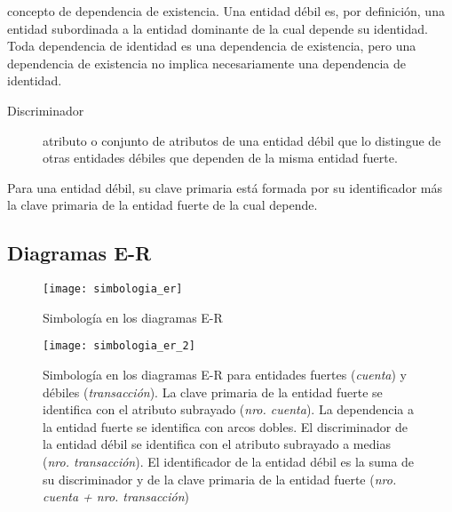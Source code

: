 \documentclass[a4paper, twoside]{article}
\begin{document}
concepto de dependencia de existencia. Una entidad débil es, por definición,
una entidad subordinada a la entidad dominante de la cual depende
su identidad. Toda dependencia de identidad es una dependencia de
existencia, pero una dependencia de existencia no implica necesariamente
una dependencia de identidad.
\begin{description}
\item [{Discriminador}] atributo o conjunto de atributos de una entidad
débil que lo distingue de otras entidades débiles que dependen de
la misma entidad fuerte.
\end{description}
Para una entidad débil, su clave primaria está formada por su identificador
más la clave primaria de la entidad fuerte de la cual depende.


\subsection{Diagramas E-R}

\begin{figure}[H]
\noindent \begin{centering}
\texttt{[image: simbologia\_er]}
\par\end{centering}

\protect\caption{Simbología en los diagramas E-R}


\end{figure}


\begin{figure}[H]
\noindent \begin{centering}
\texttt{[image: simbologia\_er\_2]}
\par\end{centering}

\protect\caption{Simbología en los diagramas E-R para entidades fuertes (\emph{cuenta})
y débiles (\emph{transacción}). La clave primaria de la entidad fuerte
se identifica con el atributo subrayado (\emph{nro. cuenta}). La dependencia
a la entidad fuerte se identifica con arcos dobles. El discriminador
de la entidad débil se identifica con el atributo subrayado a medias
(\emph{nro. transacción}). El identificador de la entidad débil es
la suma de su discriminador y de la clave primaria de la entidad fuerte
(\emph{nro. cuenta + nro. transacción})}
\end{figure}
\end{document}
